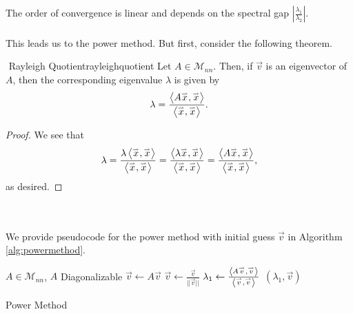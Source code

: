         The order of convergence is linear and depends on the spectral gap \(\left|\frac{\lambda_1}{\lambda_2}\right|\).
        \\
        \\
        This leads us to the power method. But first, consider the following theorem.
        \begin{theorem}{\Stop\,\,Rayleigh Quotient}{rayleighquotient}
            Let \(A\in\mathcal{M}_{nn}\). Then, if \(\vec{v}\) is an eigenvector of \(A\), then the corresponding eigenvalue \(\lambda\) is given by
            \begin{equation*}
                \lambda=\frac{\left\langle A\overset{_{\rightharpoonup}}{x},\overset{_{\rightharpoonup}}{x}\right\rangle}{\left\langle \overset{_{\rightharpoonup}}{x},\overset{_{\rightharpoonup}}{x}\right\rangle}.
            \end{equation*}
            \begin{proof}
                We see that
                \begin{equation*}
                    \lambda=\frac{\lambda\left\langle \overset{_{\rightharpoonup}}{x},\overset{_{\rightharpoonup}}{x}\right\rangle}{\left\langle \overset{_{\rightharpoonup}}{x},\overset{_{\rightharpoonup}}{x}\right\rangle}=\frac{\left\langle \lambda\overset{_{\rightharpoonup}}{x},\overset{_{\rightharpoonup}}{x}\right\rangle}{\left\langle \overset{_{\rightharpoonup}}{x},\overset{_{\rightharpoonup}}{x}\right\rangle}=\frac{\left\langle A\overset{_{\rightharpoonup}}{x},\overset{_{\rightharpoonup}}{x}\right\rangle}{\left\langle \overset{_{\rightharpoonup}}{x},\overset{_{\rightharpoonup}}{x}\right\rangle},
                \end{equation*}
                as desired.
            \end{proof}
        \end{theorem}
        \pagebreak
        \vphantom
        \\
        \\
        We provide pseudocode for the power method with initial guess \(\vec{v}\) in Algorithm \ref{alg:powermethod}.
        \begin{algorithm}[H] 
            \begin{algorithmic}[1]
                \Require \(A\in\mathcal{M}_{nn}\), \(A\) Diagonalizable 
                        \State \(\vec{v}\gets A\vec{v}\)
                        \State \(\vec{v}\gets \frac{\vec{v}}{||\vec{v}||}\)
                    \EndFor
                    \State \(\lambda_1\gets \frac{\left\langle A\overset{_{\rightharpoonup}}{v},\overset{_{\rightharpoonup}}{v}\right\rangle}{\left\langle \overset{_{\rightharpoonup}}{v},\overset{_{\rightharpoonup}}{v}\right\rangle}\)
                    \State \Return \(\left(\lambda_1,\vec{v}\right)\)
                \EndProcedure 
            \end{algorithmic}
            \caption{Power Method}
            \label{alg:powermethod}
        \end{algorithm}
        \vphantom
        \\
